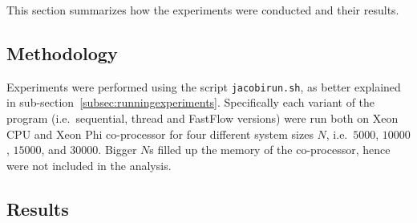 This section summarizes how the experiments were conducted and their results.

\subsection{Methodology} \label{subsec:methodology}
Experiments were performed using the script \verb|jacobirun.sh|, as better explained in sub-section~\ref{subsec:runningexperiments}.
Specifically each variant of the program (i.e.\ sequential, thread and FastFlow versions) were run both on Xeon CPU and Xeon Phi co-processor for four different system sizes $N$, i.e.\ $5000$, $10000$, $15000$, and $30000$.
Bigger $N$s filled up the memory of the co-processor, hence were not included in the analysis.

\subsection{Results} \label{subsec:results}
